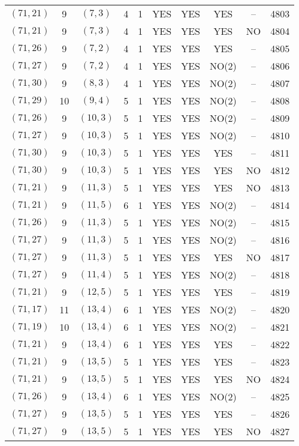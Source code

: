 \begin{longtable}{|c|c|c|c|c|c|c|c|c|c|}
$(71, 21)$ & 9 & $(7, 3)$ & 4 & 1 & YES & YES & YES & -- & 4803\\
$(71, 21)$ & 9 & $(7, 3)$ & 4 & 1 & YES & YES & YES & NO & 4804\\
$(71, 26)$ & 9 & $(7, 2)$ & 4 & 1 & YES & YES & YES & -- & 4805\\
$(71, 27)$ & 9 & $(7, 2)$ & 4 & 1 & YES & YES & NO(2) & -- & 4806\\
$(71, 30)$ & 9 & $(8, 3)$ & 4 & 1 & YES & YES & NO(2) & -- & 4807\\
$(71, 29)$ & 10 & $(9, 4)$ & 5 & 1 & YES & YES & NO(2) & -- & 4808\\
$(71, 26)$ & 9 & $(10, 3)$ & 5 & 1 & YES & YES & NO(2) & -- & 4809\\
$(71, 27)$ & 9 & $(10, 3)$ & 5 & 1 & YES & YES & NO(2) & -- & 4810\\
$(71, 30)$ & 9 & $(10, 3)$ & 5 & 1 & YES & YES & YES & -- & 4811\\
$(71, 30)$ & 9 & $(10, 3)$ & 5 & 1 & YES & YES & YES & NO & 4812\\
$(71, 21)$ & 9 & $(11, 3)$ & 5 & 1 & YES & YES & YES & NO & 4813\\
$(71, 21)$ & 9 & $(11, 5)$ & 6 & 1 & YES & YES & NO(2) & -- & 4814\\
$(71, 26)$ & 9 & $(11, 3)$ & 5 & 1 & YES & YES & NO(2) & -- & 4815\\
$(71, 27)$ & 9 & $(11, 3)$ & 5 & 1 & YES & YES & NO(2) & -- & 4816\\
$(71, 27)$ & 9 & $(11, 3)$ & 5 & 1 & YES & YES & YES & NO & 4817\\
$(71, 27)$ & 9 & $(11, 4)$ & 5 & 1 & YES & YES & NO(2) & -- & 4818\\
$(71, 21)$ & 9 & $(12, 5)$ & 5 & 1 & YES & YES & YES & -- & 4819\\
$(71, 17)$ & 11 & $(13, 4)$ & 6 & 1 & YES & YES & NO(2) & -- & 4820\\
$(71, 19)$ & 10 & $(13, 4)$ & 6 & 1 & YES & YES & NO(2) & -- & 4821\\
$(71, 21)$ & 9 & $(13, 4)$ & 6 & 1 & YES & YES & YES & -- & 4822\\
$(71, 21)$ & 9 & $(13, 5)$ & 5 & 1 & YES & YES & YES & -- & 4823\\
$(71, 21)$ & 9 & $(13, 5)$ & 5 & 1 & YES & YES & YES & NO & 4824\\
$(71, 26)$ & 9 & $(13, 4)$ & 6 & 1 & YES & YES & NO(2) & -- & 4825\\
$(71, 27)$ & 9 & $(13, 5)$ & 5 & 1 & YES & YES & YES & -- & 4826\\
$(71, 27)$ & 9 & $(13, 5)$ & 5 & 1 & YES & YES & YES & NO & 4827\\

\end{longtable}
